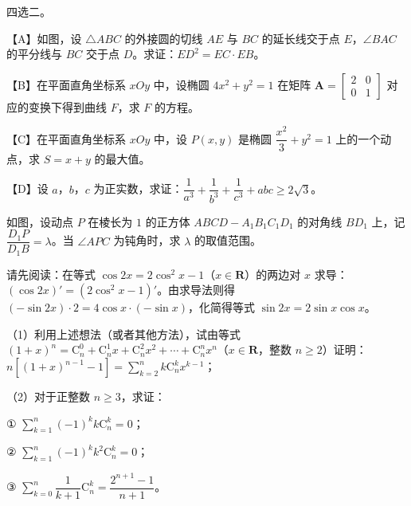 \Needspace{0.4\textheight}
\begin{question}
四选二。

【A】如图，设 $\triangle ABC$ 的外接圆的切线 $AE$ 与 $BC$ 的延长线交于点 $E$，$\angle BAC$ 的平分线与 $BC$ 交于点 $D$。求证：$ED^2=EC\cdot EB$。
\nopagebreak[4]
\begin{center}\end{center}
\nopagebreak[4]
【B】在平面直角坐标系 $xOy$ 中，设椭圆 $4x^2+y^2=1$ 在矩阵 $\boldsymbol A=\begin{bmatrix}2&0\\0&1\end{bmatrix}$ 对应的变换下得到曲线 $F$，求 $F$ 的方程。

【C】在平面直角坐标系 $xOy$ 中，设 $P(x,y)$ 是椭圆 $\dfrac{x^2}3+y^2=1$ 上的一个动点，求 $S=x+y$ 的最大值。

【D】设 $a$，$b$，$c$ 为正实数，求证：$\dfrac1{a^3}+\dfrac1{b^3}+\dfrac1{c^3}+abc\geqslant2\sqrt3$。

\Needspace{0.4\textheight}
\end{question}
\begin{question}
如图，设动点 $P$ 在棱长为 $1$ 的正方体 $ABCD-A_1B_1C_1D_1$ 的对角线 $BD_1$ 上，记 $\dfrac{D_1P}{D_1B}=\lambda$。当 $\angle APC$ 为钝角时，求 $\lambda$ 的取值范围。
\nopagebreak[4]
\begin{center}\end{center}
\nopagebreak[4]
\end{question}
\begin{question}
请先阅读：在等式 $\cos2x=2\cos^2x-1$（$x\in\mathbf R$）的两边对 $x$ 求导：$(\cos2x)'=(2\cos^2x-1)'$。由求导法则得 $(-\sin2x)\cdot2=4\cos x\cdot(-\sin x)$，化简得等式 $\sin2x=2\sin x\cos x$。

（1）利用上述想法（或者其他方法），试由等式 $(1+x)^n=\mathrm C_n^0+\mathrm C_n^1x+\mathrm C_n^2x^2+\cdots+\mathrm C_n^nx^n$（$x\in\mathbf R$，整数 $n\geqslant2$）证明：$n\left[(1+x)^{n-1}-1\right]=\sum\limits_{k=2}^nk\mathrm C_n^kx^{k-1}$；

（2）对于正整数 $n\geqslant3$，求证：

① $\sum\limits_{k=1}^n(-1)^kk\mathrm C_n^k=0$；

② $\sum\limits_{k=1}^n(-1)^kk^2\mathrm C_n^k=0$；

③ $\sum\limits_{k=0}^n\dfrac1{k+1}\mathrm C_n^k=\dfrac{2^{n+1}-1}{n+1}$。

\end{question}